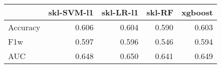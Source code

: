 \begin{tabular}{lrrrr}
\toprule
{} &  skl-SVM-l1 &  skl-LR-l1 &  skl-RF &  xgboost \\
\midrule
Accuracy &       0.606 &      0.604 &   0.590 &    0.603 \\
F1w      &       0.597 &      0.596 &   0.546 &    0.594 \\
AUC      &       0.648 &      0.650 &   0.641 &    0.649 \\
\bottomrule
\end{tabular}
